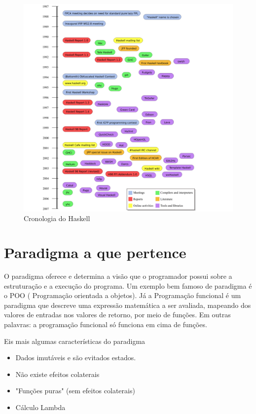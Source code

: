 \documentclass[
  article,			       %
  12pt,				         %
  oneside,			       %
  a4paper,			       %
  english,		       	 %
  brazil,			      	 %
  sumario=tradicional
]{abntex2}
\begin{document}
    \begin{figure}[ht]
      \includegraphics[width =\textwidth]{timeline.png}
      \caption{Cronologia do Haskell}
    \end{figure}

    \newpage

    \chapter{Paradigma a que pertence}

    O paradigma oferece e determina a visão que o programador possui sobre a estruturação
    e a execução do programa. Um exemplo bem famoso de paradigma é o POO ( Programação orientada a objetos).
    Já a Programação funcional é um paradigma que descreve uma expressão matemática a ser avaliada,
    mapeando dos valores de entradas nos valores de retorno, por meio de funções. Em outras palavras: 
    a programação funcional só funciona em cima de funções.

    Eis mais algumas características do paradigma
    \begin{itemize}
      \item Dados imutáveis e são evitados estados. 
      \item Não existe efeitos colaterais 
      \item "Funções puras" (sem efeitos colaterais)
      \item Cálculo Lambda
    \end{itemize}
\end{document}

